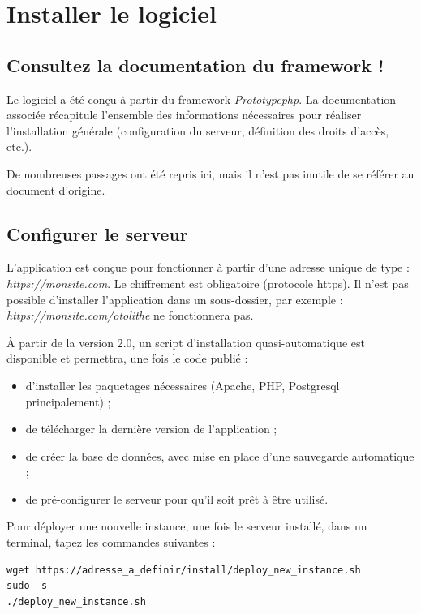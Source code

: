 \chapter{Installer le logiciel}

\section{Consultez la documentation du framework !}

Le logiciel a été conçu à partir du framework \textit{Prototypephp}. La documentation associée \cite{pphp-doc} récapitule l'ensemble des informations nécessaires pour réaliser l'installation générale (configuration du serveur, définition des droits d'accès, etc.).

De nombreuses passages ont été repris ici, mais il n'est pas inutile de se référer au document d'origine. 

\section{Configurer le serveur}

L'application est conçue pour fonctionner à partir d'une adresse unique de type : {\NoAutoSpacing\textit{https://monsite.com}}. Le chiffrement est obligatoire (protocole https). Il n'est pas possible d'installer l'application dans un sous-dossier, par exemple : {\NoAutoSpacing \textit{https://monsite.com/otolithe}} ne fonctionnera pas.

À partir de la version 2.0, un script d'installation quasi-automatique est disponible et permettra, une fois le code publié :
\begin{itemize}
\item d'installer les paquetages nécessaires (Apache, PHP, Postgresql principalement) ;
\item de télécharger la dernière version de l'application ;
\item de créer la base de données, avec mise en place d'une sauvegarde automatique ;
\item de pré-configurer le serveur pour qu'il soit prêt à être utilisé.
\end{itemize}

Pour déployer une nouvelle instance, une fois le serveur installé, dans un terminal, tapez les commandes suivantes :
\begin{lstlisting}
wget https://adresse_a_definir/install/deploy_new_instance.sh
sudo -s
./deploy_new_instance.sh
\end{lstlisting}

